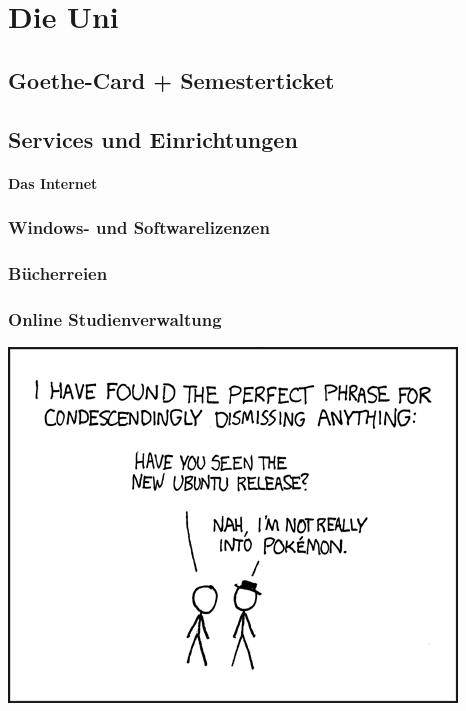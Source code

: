 \documentclass[12pt,a4paper]{scrartcl}
\begin{document}
\newpage
\section{Die Uni}
    \subsection{Goethe-Card + Semesterticket}
    
    
    \subsection{Services und Einrichtungen}
    \paragraph{Das Internet}
    
    \subsubsection*{Windows- und Softwarelizenzen}
    
    \subsubsection*{Bücherreien}
    
    \subsubsection*{Online Studienverwaltung}
    
    \begin{center}
        \vspace{2cm}
        \includegraphics{comics/not_really_into_pokemon.png}
    \end{center}
    \newpage
\end{document}
